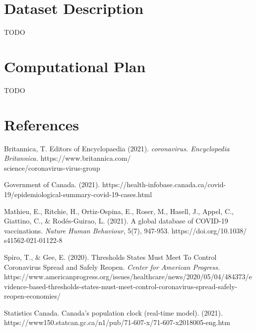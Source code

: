 \documentclass[fontsize=11pt]{article}
\begin{document}
    \section*{Dataset Description}

    TODO

    \section*{Computational Plan}

    TODO

    \section*{References}


    \hangindent=0.7cm
    Britannica, T. Editors of Encyclopaedia (2021). \textit{coronavirus. Encyclopedia Britannica.} https://www.britannica.com/\\science/coronavirus-virus-group

    \hangindent=0.7cm \noindent
    Government of Canada. (2021). https://health-infobase.canada.ca/covid-19/epidemiological-summary-covid-19-cases.html

    \hangindent=0.7cm \noindent
    Mathieu, E., Ritchie, H., Ortiz-Ospina, E., Roser, M., Hasell, J., Appel, C., Giattino, C., \& Rodés-Guirao, L. (2021). A global database of COVID-19 vaccinations. \textit{Nature Human Behaviour}, 5(7), 947-953. https://doi.org/10.1038/\\s41562-021-01122-8

    \hangindent=0.7cm \noindent
    Spiro, T., \& Gee, E. (2020). Thresholds States Must Meet To Control Coronavirus Spread and Safely Reopen. \textit{Center for American Progress.} https://www.americanprogress.org/issues/healthcare/news/2020/05/04/484373/evidence-based-thresholds-states-must-meet-control-coronavirus-spread-safely-reopen-economies/

    \hangindent=0.7cm \noindent
    Statistics Canada. Canada's population clock (real-time model). (2021). https://www150.statcan.gc.ca/n1/pub/71-607-x/71-607-x2018005-eng.htm
\end{document}
